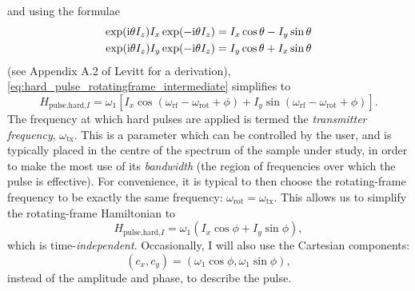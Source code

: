 and using the formulae
\begin{align}
    \exp(\mathrm{i}\theta I_z)I_x\exp(-\mathrm{i}\theta I_z) = I_x\cos\theta - I_y\sin\theta \label{eq:sandwich_formula_1} \\
    \exp(\mathrm{i}\theta I_z)I_y\exp(-\mathrm{i}\theta I_z) = I_y\cos\theta + I_x\sin\theta \label{eq:sandwich_formula_2}
\end{align}
(see Appendix A.2 of Levitt\autocite{Levitt2008} for a derivation), \cref{eq:hard_pulse_rotatingframe_intermediate} simplifies to
\begin{equation}
    \label{eq:hard_pulse_rotatingframe}
    H_{\text{pulse,hard,}I} = \omega_1 \left[I_x \cos(\omega_\text{rf} - \omega_\text{rot} + \phi) + I_y \sin(\omega_\text{rf} - \omega_\text{rot} + \phi) \right].
\end{equation}
The frequency at which hard pulses are applied is termed the \textit{transmitter frequency}, $\omega_\text{tx}$.
This is a parameter which can be controlled by the user, and is typically placed in the centre of the spectrum of the sample under study, in order to make the most use of its \textit{bandwidth} (the region of frequencies over which the pulse is effective).
For convenience, it is typical to then choose the rotating-frame frequency to be exactly the same frequency: $\omega_\text{rot} = \omega_\text{tx}$.
This allows us to simplify the rotating-frame Hamiltonian to
\begin{equation}
    \label{eq:hard_pulse_onresonance}
    H_{\text{pulse,hard,}I} = \omega_1 (I_x\cos\phi + I_y\sin\phi),
\end{equation}
which is time-\textit{independent}.
Occasionally, I will also use the Cartesian components:
\begin{equation}
    \label{eq:pulse_cartesian}
    (c_x, c_y) = (\omega_1 \cos\phi, \omega_1 \sin\phi),
\end{equation}
instead of the amplitude and phase, to describe the pulse.

